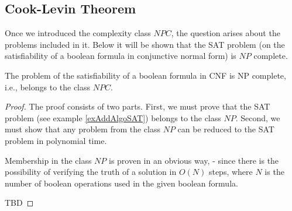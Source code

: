 \subsection{Cook-Levin Theorem}

Once we introduced the complexity class $NPC$, the question arises about the problems included in it. Below it will be shown that the SAT problem (on the satisfiability of a boolean formula in conjunctive normal form) is $NP$ complete.

\begin{theorem}
The problem of the satisfiability of a boolean formula in CNF is NP complete, i.e., belongs to the class $NPC$.
\label{theoremAddAlgoCookTheorem}
\end{theorem}

\begin{proof}
  The proof consists of two parts. First, we must prove that the SAT problem (see example \ref{exAddAlgoSAT}) belongs to the class $NP$. Second, we must show that any problem from the class $NP$ can be reduced to the SAT problem in polynomial time.
  
  Membership in the class $NP$ is proven in an obvious way, - since there is the possibility of verifying the truth of a solution in $O\left(N\right)$ steps, where $N$ is the number of boolean operations used in the given boolean formula.

 
  TBD
\end{proof}